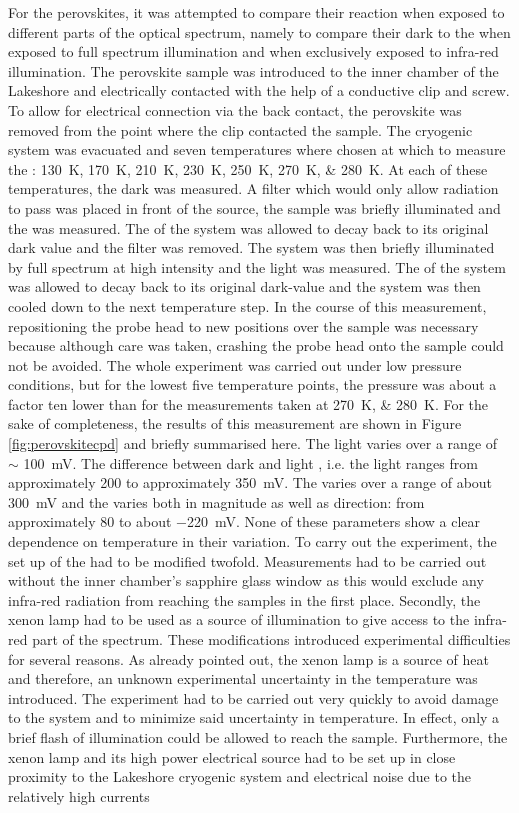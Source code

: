 For the perovskites, it was attempted to compare their reaction when exposed to different parts of the optical spectrum, namely to compare their dark \cpd{} to the \cpd{} when exposed to full spectrum illumination and when exclusively exposed to infra-red illumination. The perovskite sample was introduced to the inner chamber of the Lakeshore and electrically contacted with the help of a conductive clip and screw. To allow for electrical connection via the back contact, the perovskite was removed from the point where the clip contacted the sample. The cryogenic system was evacuated and seven temperatures where chosen at which to measure the \cpd{}: \SIlist{130;170;210;230;250;270;280}{\kelvin}. At each of these temperatures, the dark \cpd{} was measured. A filter which would only allow \ir{} radiation to pass was placed in front of the source, the sample was briefly illuminated and the \ir{} \cpd{} was measured. The \cpd{} of the system was allowed to decay back to its original dark value and the filter was removed. The system was then briefly illuminated by full spectrum at high intensity and the light \cpd{} was measured. The \cpd{} of the system was allowed to decay back to its original dark-value and the system was then cooled down to the next temperature step. In the course of this measurement, repositioning the probe head to new positions over the sample was necessary because although care was taken, crashing the probe head onto the sample could not be avoided. The whole experiment was carried out under low pressure conditions, but for the lowest five temperature points, the pressure was about a factor ten lower than for the measurements taken at \SIlist{270;280}{\kelvin}. For the sake of completeness, the results of this measurement are shown in Figure \ref{fig:perovskitecpd} and briefly summarised here. The light \cpd{} varies over a range of $\sim$ \SI{100}{\milli\volt}. The difference between dark and light \cpd{}, i.e. the light \spv{} ranges from approximately 200 to approximately \SI{350}{\milli\volt}. The \ir{} \cpd{} varies over a range of about \SI{300}{\milli\volt} and the \ir{} \spv{} varies both in magnitude as well as direction: from approximately 80 to about \SI{-220}{\milli\volt}. None of these parameters show a clear dependence on temperature in their variation. To carry out the experiment, the set up of the \McA{} had to be modified twofold. Measurements had to be carried out without the inner chamber's sapphire glass window as this would exclude any infra-red radiation from reaching the samples in the first place. Secondly, the xenon lamp had to be used as a source of illumination to give access to the infra-red part of the spectrum. These modifications introduced experimental difficulties for several reasons. As already pointed out, the xenon lamp is a source of heat and therefore, an unknown experimental uncertainty in the temperature was introduced. The experiment had to be carried out very quickly to avoid damage to the system and to minimize said uncertainty in temperature. In effect, only a brief flash of illumination could be allowed to reach the sample. Furthermore, the xenon lamp and its high power electrical source had to be set up in close proximity to the Lakeshore cryogenic system and electrical noise due to the relatively high currents 